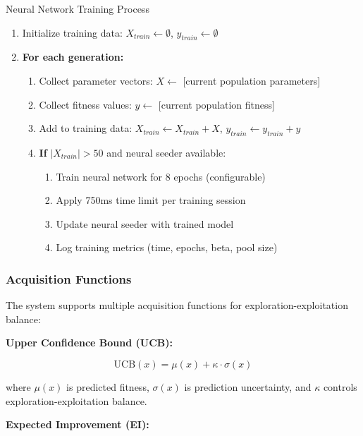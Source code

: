 \documentclass[12pt,a4paper]{article}
\begin{document}
\begin{algorithm}
\caption{Neural Network Training Process}
\begin{enumerate}
    \item Initialize training data: $X_{train} \leftarrow \emptyset$, $y_{train} \leftarrow \emptyset$
    \item \textbf{For each generation:}
    \begin{enumerate}
        \item Collect parameter vectors: $X \leftarrow$ [current population parameters]
        \item Collect fitness values: $y \leftarrow$ [current population fitness]
        \item Add to training data: $X_{train} \leftarrow X_{train} + X$, $y_{train} \leftarrow y_{train} + y$
        \item \textbf{If} $|X_{train}| > 50$ and neural seeder available:
        \begin{enumerate}
            \item Train neural network for 8 epochs (configurable)
            \item Apply 750ms time limit per training session
            \item Update neural seeder with trained model
            \item Log training metrics (time, epochs, beta, pool size)
        \end{enumerate}
    \end{enumerate}
\end{enumerate}
\end{algorithm}

\subsubsection{Acquisition Functions}

The system supports multiple acquisition functions for exploration-exploitation balance:

\textbf{Upper Confidence Bound (UCB):}

\begin{equation}\label{Eq.neural_ucb}
\text{UCB}(x) = \mu(x) + \kappa \cdot \sigma(x)
\end{equation}

where $\mu(x)$ is predicted fitness, $\sigma(x)$ is prediction uncertainty, and $\kappa$ controls exploration-exploitation balance.

\textbf{Expected Improvement (EI):}
\end{document}
